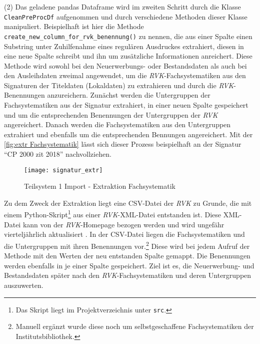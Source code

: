     (2) Das geladene pandas Dataframe wird im zweiten Schritt durch die Klasse \texttt{CleanPreProcDf} aufgenommen und durch verschiedene Methoden dieser Klasse
    manipuliert. Beispielhaft ist hier die Methode \texttt{create\_new\_column\_for\_rvk\_benennung()} zu nennen, die aus einer Spalte einen Substring unter
    Zuhilfenahme eines regulären Ausdruckes extrahiert, diesen in eine neue Spalte schreibt und ihn um zusätzliche Informationen anreichert. 
    Diese Methode wird sowohl bei den Neuerwerbungs- oder Bestandsdaten als auch bei den Ausleihdaten zweimal angewendet, um die \textit{\acrshort{RVK}}-Fachsystematiken aus den
    Signaturen der Titeldaten (Lokaldaten) zu extrahieren und durch die \textit{\acrshort{RVK}}-Benennungen anzureichern. 
    Zunächst werden die Untergruppen der Fachsystematiken aus der Signatur extrahiert, in einer neuen Spalte gespeichert und um die entsprechenden Benennungen der Untergruppen der 
    \textit{\acrshort{RVK}} angereichert. 
    Danach werden die Fachsystematiken aus den Untergruppen extrahiert und ebenfalls um die entsprechenden Bennungen angereichert.
    Mit der \autoref{fig:extr Fachsystematik} lässt sich dieser Prozess beispielhaft an der Signatur \enquote{CP 2000 zit 2018} nachvollziehen.
    \begin{figure}[H]
        \centering
            \texttt{[image: signatur\_extr]}
            \caption{Teilsystem 1 Import - Extraktion Fachsystematik}
            \label{fig:extr Fachsystematik}
    \end{figure}

    Zu dem Zweck der Extraktion liegt eine CSV-Datei der \textit{\acrshort{RVK}} zu Grunde, die mit einem Python-Skript\footnote{ Das Skript liegt im Projektverzeichnis
    unter \texttt{src}.} aus einer \textit{\acrshort{RVK}}-XML-Datei entstanden ist.
    Diese XML-Datei kann von der \textit{\acrshort{RVK}}-Homepage bezogen werden und wird ungefähr vierteljährlich aktualisiert \cite[vgl.][]{rvk_rvk_2021}.
    In der CSV-Datei liegen die Fachsystematiken und die Untergruppen mit ihren Benennungen vor.\footnote{ Manuell ergänzt wurde diese noch um selbstgeschaffene Fachsystematiken der Institutsbibliothek.}
    Diese wird bei jedem Aufruf der Methode mit den Werten der neu entstanden Spalte gemappt. Die Benennungen werden ebenfalls in je einer Spalte gespeichert.
    Ziel ist es, die Neuerwerbung- und Bestandsdaten später nach den \textit{\acrshort{RVK}}-Fachsystematiken und deren Untergruppen auszuwerten.
    
